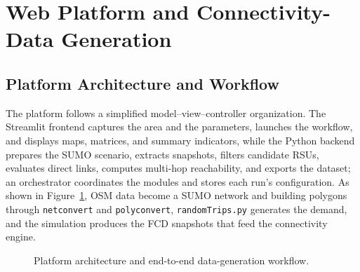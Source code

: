 \documentclass[engproc,proceedingpaper,submit,oneauthor]{Definitions/mdpi}
\newcommand{\CVR}{\mathrm{CVR}}
\begin{document}
\section{Web Platform and Connectivity-Data Generation}\label{sec:method}

\subsection{Platform Architecture and Workflow}
The platform follows a simplified model--view--controller organization. The Streamlit
frontend captures the area and the parameters, launches the workflow, and displays
maps, matrices, and summary indicators, while the Python backend prepares the SUMO
scenario, extracts snapshots, filters candidate RSUs, evaluates direct links, computes
multi-hop reachability, and exports the dataset; an orchestrator coordinates the
modules and stores each run's configuration. As shown in
Figure~\ref{fig:architecture}, OSM data become a SUMO network and building polygons
through \texttt{netconvert} and \texttt{polyconvert}, \texttt{randomTrips.py} generates
the demand, and the simulation produces the FCD snapshots that feed the connectivity
engine.

\begin{figure}[H]
\centering
{}
\caption{Platform architecture and end-to-end data-generation workflow.}
\label{fig:architecture}
\end{figure}
\end{document}
